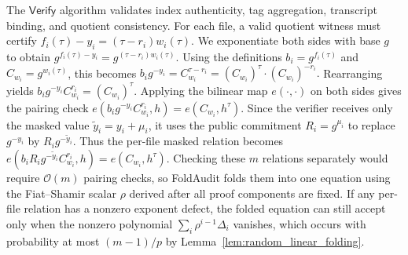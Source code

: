 \documentclass[lettersize,journal]{IEEEtran}
\newcommand{\Verify}{\mathsf{Verify}}
\begin{document}
The $\Verify$ algorithm validates index authenticity, tag aggregation, transcript binding, and quotient consistency. 
For each file, a valid quotient witness must certify
$
f_i(\tau)-y_i=(\tau-r_i)w_i(\tau)
$.
We exponentiate both sides with base $g$ to obtain
$g^{f_i(\tau)-y_i}=g^{(\tau-r_i)w_i(\tau)}.$
Using the definitions $b_i=g^{f_i(\tau)}$ and $C_{w_i}=g^{w_i(\tau)}$, this becomes
$b_i g^{-y_i} = C_{w_i}^{\tau-r_i} = (C_{w_i})^{\tau}\cdot (C_{w_i})^{-r_i}.$
Rearranging yields
$
b_i g^{-y_i} C_{w_i}^{r_i} = (C_{w_i})^{\tau}.
$
Applying the bilinear map $e(\cdot,\cdot)$ on both sides gives the pairing check
$
e(b_i g^{-y_i}C_{w_i}^{r_i},h)=e(C_{w_i},h^\tau).
$
Since the verifier receives only the masked value $\tilde{y}_i=y_i+\mu_i$, it uses the public commitment $R_i=g^{\mu_i}$ to replace $g^{-y_i}$ by $R_i g^{-\tilde{y}_i}$. Thus the per-file masked relation becomes
$
e(b_iR_i g^{-\tilde{y}_i}C_{w_i}^{r_i},h)=e(C_{w_i},h^\tau)
$.
Checking these $m$ relations separately would require $\mathcal{O}(m)$ pairing checks, so FoldAudit folds them into one equation using the Fiat--Shamir scalar $\rho$ derived after all proof components are fixed. If any per-file relation has a nonzero exponent defect, the folded equation can still accept only when the nonzero polynomial $\sum_i\rho^{i-1}\Delta_i$ vanishes, which occurs with probability at most $(m-1)/p$ by Lemma~\ref{lem:random_linear_folding}.
\end{document}
